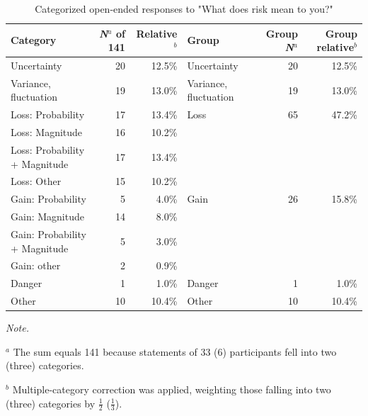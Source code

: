 \documentclass[a4paper,man, natbib,floatsintext]{apa6} %
\begin{document}
\begin{table}
\centering
\begin{threeparttable}
\caption{Categorized open-ended responses to "What does risk mean to you?"}
\small
\label{table:QualRisk1}
\begin{tabular}[12cm]{lrrlrr}
Category & \textit{N}$^a$ of 141 & Relative$^b$ & Group & Group \textit{N}$^a$ & Group relative$^b$ \\ 
  \midrule
Uncertainty &  20 & 12.5\% & Uncertainty &  20 & 12.5\% \\ 
  Variance, fluctuation &  19 & 13.0\% & Variance, fluctuation &  19 & 13.0\% \\ 
  Loss: Probability &  17 & 13.4\% & Loss &  65 & 47.2\% \\ 
  Loss: Magnitude &  16 & 10.2\% &  &  &  \\ 
  Loss: Probability + Magnitude &  17 & 13.4\% &  &  &  \\ 
  Loss: Other &  15 & 10.2\% &  &  &  \\ 
  Gain: Probability &   5 & 4.0\% & Gain &  26 & 15.8\% \\ 
  Gain: Magnitude &  14 & 8.0\% &  &  &  \\ 
  Gain: Probability + Magnitude &   5 & 3.0\% &  &  &  \\ 
  Gain: other &   2 & 0.9\% &  &  &  \\ 
  Danger &   1 & 1.0\% & Danger &   1 & 1.0\% \\ 
  Other &  10 & 10.4\% & Other &  10 & 10.4\% \\ 
   \bottomrule
\end{tabular}

\begin{tablenotes}
\renewcommand{\TPTminimum}{\linewidth}
\def\tnote#1{\protect\TPToverlap{\TPTtagStyle{#1}}}%
\small
\textit{Note.}\\
    \item[$^a$] The sum equals 141 because statements of 33 (6) participants fell into two (three) categories.\\
    \item[$^b$] Multiple-category correction was applied, weighting those falling into two (three) categories by $\frac{1}{2}$ ($\frac{1}{3}$).

\end{tablenotes}
\end{threeparttable}
\end{table}
\end{document}
